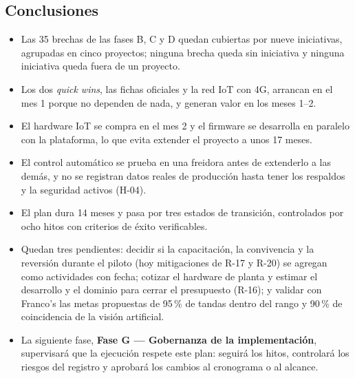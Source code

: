 \subsection{Conclusiones}

\begin{itemize}
  \item Las 35 brechas de las fases B, C y D quedan cubiertas por nueve iniciativas, agrupadas en cinco proyectos; ninguna brecha queda sin iniciativa y ninguna iniciativa queda fuera de un proyecto.
  \item Los dos \textit{quick wins}, las fichas oficiales y la red IoT con 4G, arrancan en el mes 1 porque no dependen de nada, y generan valor en los meses 1--2.
  \item El hardware IoT se compra en el mes 2 y el firmware se desarrolla en paralelo con la plataforma, lo que evita extender el proyecto a unos 17 meses.
  \item El control automático se prueba en una freidora antes de extenderlo a las demás, y no se registran datos reales de producción hasta tener los respaldos y la seguridad activos (H-04).
  \item El plan dura 14 meses y pasa por tres estados de transición, controlados por ocho hitos con criterios de éxito verificables.
  \item Quedan tres pendientes: decidir si la capacitación, la convivencia y la reversión durante el piloto (hoy mitigaciones de R-17 y R-20) se agregan como actividades con fecha; cotizar el hardware de planta y estimar el desarrollo y el dominio para cerrar el presupuesto (R-16); y validar con Franco's las metas propuestas de 95\,\% de tandas dentro del rango y 90\,\% de coincidencia de la visión artificial.
  \item La siguiente fase, \textbf{Fase G --- Gobernanza de la implementación}, supervisará que la ejecución respete este plan: seguirá los hitos, controlará los riesgos del registro y aprobará los cambios al cronograma o al alcance.
\end{itemize}

